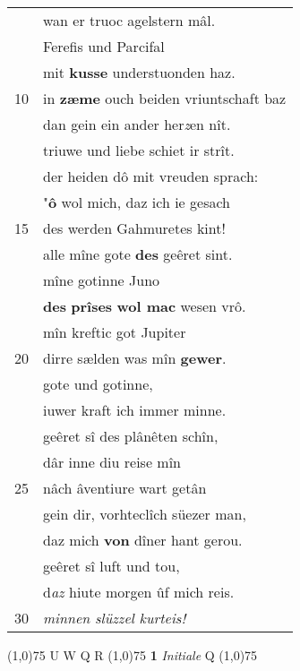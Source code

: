 \documentclass[8pt,a4paper,notitlepage]{article}
\begin{document}
\begin{table}[ht]
\begin{minipage}[t]{0.5\linewidth}
\begin{tabular}{rl}
 & wan er truoc agelstern mâl.\\ 
 & Ferefis und Parcifal\\ 
 & mit \textbf{kusse} understuonden haz.\\ 
10 & in \textbf{zæme} ouch beiden vriuntschaft baz\\ 
 & dan gein ein ander her\textit{z}en nît.\\ 
 & triuwe und liebe schiet ir strît.\\ 
 & der heiden dô mit vreuden sprach:\\ 
 & "\textbf{ô} wol mich, daz ich ie gesach\\ 
15 & des werden Gahmuretes kint!\\ 
 & alle mîne gote \textbf{des} geêret sint.\\ 
 & mîne gotinne Juno\\ 
 & \textbf{des} \textbf{prîses} \textbf{wol mac} wesen vrô.\\ 
 & mîn kreftic got Jupiter\\ 
20 & dirre sælden was mîn \textbf{gewer}.\\ 
 & gote und gotinne,\\ 
 & iuwer kraft ich immer minne.\\ 
 & geêret sî des plânêten schîn,\\ 
 & dâr inne diu reise mîn\\ 
25 & nâch âventiure wart getân\\ 
 & gein dir, vorhteclîch süezer man,\\ 
 & daz mich \textbf{von} dîner hant gerou.\\ 
 & geêret sî luft und tou,\\ 
 & d\textit{az} hiute morgen ûf mich reis.\\ 
30 & \textit{minnen slüzzel kurteis!}\\ 
\end{tabular}
\scriptsize
\line(1,0){75} \newline
U W Q R \newline
\line(1,0){75} \newline
\textbf{1} \textit{Initiale} Q  \newline
\line(1,0){75} \newline

\end{minipage}
\end{table}
\end{document}
